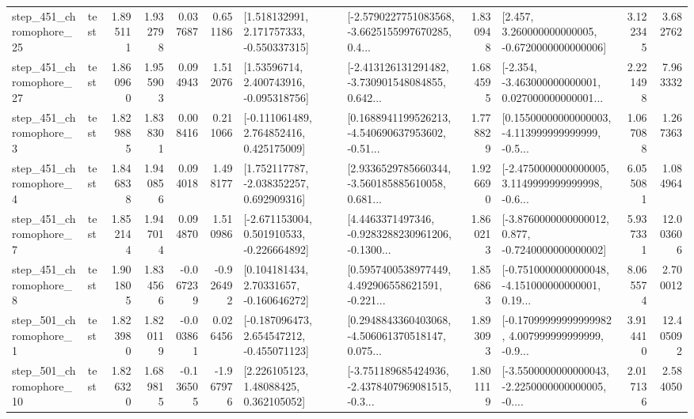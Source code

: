 \begin{tabular}{llrrrrllrlrr}
  step\_451\_chromophore\_25 &      test &      1.895111 &    1.932798 &      0.037687 &  0.651186 &    [1.518132991, 2.171757333, -0.550337315] &  [-2.5790227751083568, -3.6625155997670285, 0.4... &       1.830948 &    [2.457, 3.260000000000005, -0.6720000000000006] &            3.122345 &          3.682762 \\
  step\_451\_chromophore\_27 &      test &      1.860960 &    1.955903 &      0.094943 &  1.512076 &     [1.53596714, 2.400743916, -0.095318756] &  [-2.413126131291482, -3.730901548084855, 0.642... &       1.684595 &  [-2.354, -3.463000000000001, 0.027000000000001... &            2.221498 &          7.963332 \\
   step\_451\_chromophore\_3 &      test &      1.829885 &    1.838301 &      0.008416 &  0.211066 &    [-0.111061489, 2.764852416, 0.425175009] &  [0.1688941199526213, -4.540690637953602, -0.51... &       1.778829 &  [0.15500000000000003, -4.113999999999999, -0.5... &            1.067088 &          1.267363 \\
   step\_451\_chromophore\_4 &      test &      1.846838 &    1.940856 &      0.094018 &  1.498177 &    [1.752117787, -2.038352257, 0.692909316] &  [2.9336529785660344, -3.560185885610058, 0.681... &       1.926690 &  [-2.4750000000000005, 3.1149999999999998, -0.6... &            6.055081 &          1.084964 \\
   step\_451\_chromophore\_7 &      test &      1.852144 &    1.947014 &      0.094870 &  1.510986 &   [-2.671153004, 0.501910533, -0.226664892] &  [4.4463371497346, -0.9283288230961206, -0.1300... &       1.860213 &  [-3.8760000000000012, 0.877, -0.7240000000000002] &            5.937331 &         12.003606 \\
   step\_451\_chromophore\_8 &      test &      1.901805 &    1.834566 &     -0.067239 & -0.926492 &     [0.104181434, 2.70331657, -0.160646272] &  [0.5957400538977449, 4.492906558621591, -0.221... &       1.856863 &  [-0.7510000000000048, -4.151000000000001, 0.19... &            8.065574 &          2.700012 \\
   step\_501\_chromophore\_1 &      test &      1.823980 &    1.820119 &     -0.003861 &  0.026456 &   [-0.187096473, 2.654547212, -0.455071123] &  [0.2948843360403068, -4.506061370518147, 0.075... &       1.893093 &  [-0.17099999999999982, 4.007999999999999, -0.9... &            3.914410 &         12.405092 \\
  step\_501\_chromophore\_10 &      test &      1.826320 &    1.689815 &     -0.136505 & -1.967976 &      [2.226105123, 1.48088425, 0.362105052] &  [-3.751189685424936, -2.4378407969081515, -0.3... &       1.801119 &  [-3.5500000000000043, -2.2250000000000005, -0.... &            2.017136 &          2.584050 \\

\end{tabular}

